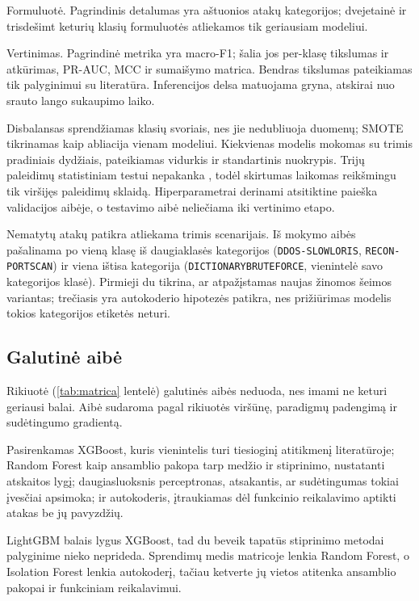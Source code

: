 Formuluotė. Pagrindinis detalumas yra aštuonios atakų kategorijos;
dvejetainė ir trisdešimt keturių klasių formuluotės atliekamos tik
geriausiam modeliui.

Vertinimas. Pagrindinė metrika yra macro-F1; šalia jos per-klasę
tikslumas ir atkūrimas, PR-AUC, MCC ir sumaišymo matrica. Bendras
tikslumas pateikiamas tik palyginimui su literatūra. Inferencijos delsa
matuojama gryna, atskirai nuo srauto lango sukaupimo laiko.

Disbalansas sprendžiamas klasių svoriais, nes jie nedubliuoja duomenų;
SMOTE \cite{chawla2002smote} tikrinamas kaip abliacija vienam modeliui.
Kiekvienas modelis mokomas su trimis pradiniais dydžiais, pateikiamas
vidurkis ir standartinis nuokrypis. Trijų paleidimų statistiniam testui
nepakanka \cite{dietterich1998tests}, todėl skirtumas laikomas
reikšmingu tik viršijęs paleidimų sklaidą. Hiperparametrai derinami
atsitiktine paieška validacijos aibėje, o testavimo aibė neliečiama iki
vertinimo etapo.

Nematytų atakų patikra atliekama trimis scenarijais. Iš mokymo aibės
pašalinama po vieną klasę iš daugiaklasės kategorijos
(\texttt{DDOS-SLOWLORIS}, \texttt{RECON-PORTSCAN}) ir viena ištisa
kategorija (\texttt{DICTIONARYBRUTEFORCE}, vienintelė savo kategorijos
klasė). Pirmieji du tikrina, ar atpažįstamas naujas žinomos šeimos
variantas; trečiasis yra autokoderio hipotezės patikra, nes prižiūrimas
modelis tokios kategorijos etiketės neturi.

\subsection{Galutinė aibė}
\label{sec:parinkimas_isvados}

Rikiuotė (\ref{tab:matrica} lentelė) galutinės aibės neduoda, nes imami
ne keturi geriausi balai.
Aibė sudaroma pagal rikiuotės viršūnę, paradigmų padengimą ir
sudėtingumo gradientą.

Pasirenkamas XGBoost, kuris vienintelis turi tiesioginį atitikmenį
literatūroje; Random Forest kaip ansamblio pakopa tarp medžio ir
stiprinimo, nustatanti atskaitos lygį; daugiasluoksnis perceptronas,
atsakantis, ar sudėtingumas tokiai įvesčiai apsimoka; ir autokoderis,
įtraukiamas dėl funkcinio reikalavimo aptikti atakas be jų pavyzdžių.

LightGBM balais lygus XGBoost, tad du beveik tapatūs stiprinimo metodai
palyginime nieko neprideda. Sprendimų medis matricoje lenkia Random
Forest, o Isolation Forest lenkia autokoderį, tačiau ketverte jų vietos
atitenka ansamblio pakopai ir funkciniam reikalavimui.
